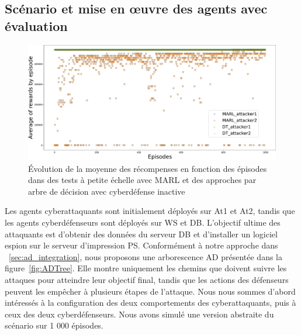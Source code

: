 


\subsection{Scénario et mise en œuvre des agents avec évaluation}

\begin{figure}
    \centering
    \includegraphics[width=\linewidth]{figures/graphs.pdf}
    \caption{Évolution de la moyenne des récompenses en fonction des épisodes dans des tests à petite échelle avec MARL et des approches par arbre de décision avec cyberdéfense inactive
    }
    \label{fig:graphs}
\end{figure}

\noindent
Les agents cyberattaquants sont initialement déployés sur At1 et At2, tandis que les agents cyberdéfenseurs sont déployés sur WS et DB. L'objectif ultime des attaquants est d'obtenir des données du serveur DB et d'installer un logiciel espion sur le serveur d'impression PS. Conformément à notre approche dans ~\ref{sec:ad_integration}, nous proposons une arborescence AD présentée dans la figure~\ref{fig:ADTree}. Elle montre uniquement les chemins que doivent suivre les attaques pour atteindre leur objectif final, tandis que les actions des défenseurs peuvent les empêcher à plusieurs étapes de l'attaque.
Nous nous sommes d'abord intéressés à la configuration des deux comportements des cyberattaquants, puis à ceux des deux cyberdéfenseurs. Nous avons simulé une version abstraite du scénario sur 1 000 épisodes.

